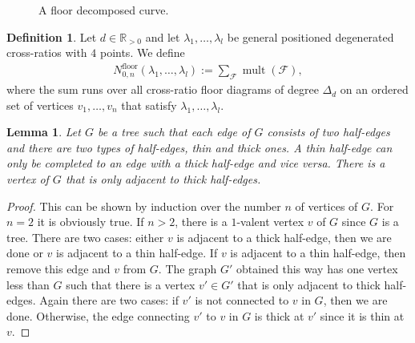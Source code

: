 \documentclass[11pt,reqno,a4]{amsart}
\theoremstyle{dotless}
\newtheorem{lemma}[corollary]{Lemma}
\theoremstyle{definition}
\newtheorem{definition}[corollary]{Definition}
\newcommand{\mult}{\operatorname{mult}}
\begin{document}
\begin{figure}
\centering
\def\svgwidth{300pt}

\caption{A floor decomposed curve.}
\label{Example_construction_cross_ratio_floor_diagram2}
\end{figure}


\begin{definition}\label{definition:number_floor}
Let $d\in\mathbb{R}_{>0}$ and let $\lambda_1,\dots,\lambda_l$ be general positioned degenerated cross-ratios with $4$ points. We define
\begin{align*}
N_{0,n}^{\textrm{floor}}\left(\lambda_1,\dots,\lambda_l\right)
:=\sum_{\mathcal{F}} \mult(\mathcal{F}),
\end{align*}
where the sum runs over all cross-ratio floor diagrams of degree $\Delta_d$ on an ordered set of vertices $v_1,\dots,v_n$ that satisfy $\lambda_1,\dots,\lambda_l$.
\end{definition}


\begin{lemma}\label{lemma:vertex_only_thick_edges}
Let $G$ be a tree such that each edge of $G$ consists of two half-edges and there are two types of half-edges, thin and thick ones. A thin half-edge can only be completed to an edge with a thick half-edge and vice versa. There is a vertex of $G$ that is only adjacent to thick half-edges.
\end{lemma}


\begin{proof}
This can be shown by induction over the number $n$ of vertices of $G$. For $n=2$ it is obviously true. If $n>2$, there is a $1$-valent vertex $v$ of $G$ since $G$ is a tree. There are two cases: either $v$ is adjacent to a thick half-edge, then we are done or $v$ is adjacent to a thin half-edge. If $v$ is adjacent to a thin half-edge, then remove this edge and $v$ from $G$. The graph $G'$ obtained this way has one vertex less than $G$ such that there is a vertex $v'\in G'$ that is only adjacent to thick half-edges. Again there are two cases: if $v'$ is not connected to $v$ in $G$, then we are done. Otherwise, the edge connecting $v'$ to $v$ in $G$ is thick at $v'$ since it is thin at $v$.
\end{proof}
\end{document}
